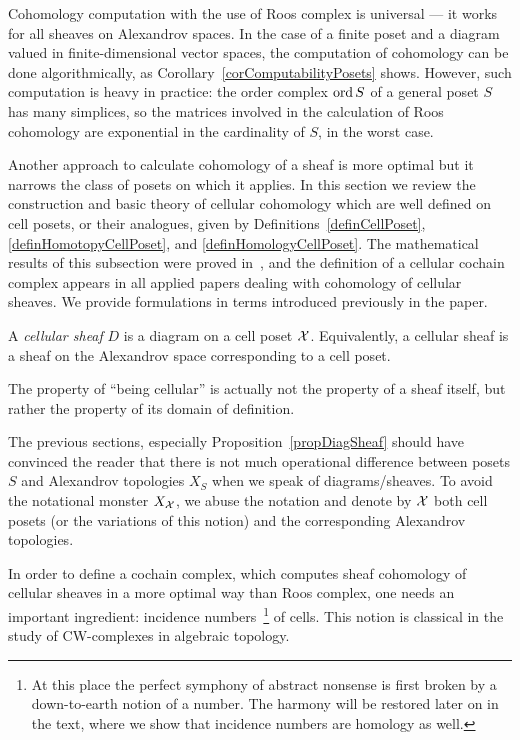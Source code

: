 Cohomology computation with the use of Roos complex is universal --- it works for all sheaves on Alexandrov spaces. In the case of a finite poset and a diagram valued in finite-dimensional vector spaces, the computation of cohomology can be done algorithmically, as Corollary~\ref{corComputabilityPosets} shows. However, such computation is heavy in practice: the order complex $\operatorname{ord} S$ of a general poset $S$ has many simplices, so the matrices involved in the calculation of Roos cohomology are exponential in the cardinality of $S$, in the worst case.

Another approach to calculate cohomology of a sheaf is more optimal but it narrows the class of posets on which it applies. In this section we review the construction and basic theory of cellular cohomology which are well defined on cell posets, or their analogues, given by Definitions~\ref{definCellPoset}, \ref{definHomotopyCellPoset}, and \ref{definHomologyCellPoset}.%
The mathematical results of this subsection were proved in~\cite{EVERITT2015134}, and the definition of a cellular cochain complex appears in all applied papers dealing with cohomology of cellular sheaves. We provide formulations in terms introduced previously in the paper.

\begin{defin}\label{definCellularSheaf}
A \emph{cellular sheaf} $D$ is a diagram on a cell poset $\mathcal{X}$. Equivalently, a cellular sheaf is a sheaf on the Alexandrov space corresponding to a cell poset.
\end{defin}

The property of ``being cellular'' is actually not the property of a sheaf itself, but rather the property of its domain of definition.

\begin{rem}
The previous sections, especially Proposition~\ref{propDiagSheaf} should have convinced the reader that there is not much operational difference between posets $S$ and Alexandrov topologies $X_S$ when we speak of diagrams/sheaves. To avoid the notational monster $X_{\mathcal{X}}$, we abuse the notation and denote by $\mathcal{X}$ both cell posets (or the variations of this notion) and the corresponding Alexandrov topologies.
\end{rem}

In order to define a cochain complex, which computes sheaf cohomology of cellular sheaves in a more optimal way than Roos complex, one needs an important ingredient: incidence numbers~\footnote{At this place the perfect symphony of abstract nonsense is first broken by a down-to-earth notion of a number. The harmony will be restored later on in the text, where we show that incidence numbers are homology as well.} of cells. This notion is classical in the study of CW-complexes in algebraic topology. %

